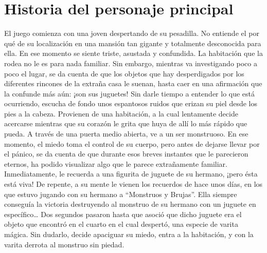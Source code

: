 \section{Historia del personaje principal}

El juego comienza con una joven despertando de su pesadilla. No entiende el por qué de su localización en una mansión tan gigante y totalmente desconocida para ella. En ese momento se siente triste, asustada y confundida. La habitación que la rodea no le es para nada familiar. Sin embargo, mientras va investigando poco a poco el lugar, se da cuenta de que los objetos que hay desperdigados por los diferentes rincones de la extraña casa le suenan, hasta caer en una afirmación que la confunde más aún: ¡son sus juguetes! Sin darle tiempo a entender lo que está ocurriendo, escucha de fondo unos espantosos ruidos que erizan su piel desde los pies a la cabeza. Provienen de una habitación, a la cual lentamente decide acercarse mientras que su corazón le grita que huya de allí lo más rápido que pueda. A través de una puerta medio abierta, ve a un ser monstruoso. En ese momento, el miedo toma el control de su cuerpo, pero antes de dejarse llevar por el pánico, se da cuenta de que durante esos breves instantes que le parecieron eternos, ha podido visualizar algo que le parece extrañamente familiar. Inmediatamente, le recuerda a una figurita de juguete de su hermano, ¡pero ésta está viva!\newline
\newline
De repente, a su mente le vienen los recuerdos de hace unos días, en los que estuvo jugando con su hermano a “Monstruos y Brujas”. Ella siempre conseguía la victoria destruyendo al monstruo de su hermano con un juguete en específico… Dos segundos pasaron hasta que asoció que dicho juguete era el objeto que encontró en el cuarto en el cual despertó, una especie de varita mágica. Sin dudarlo, decide apaciguar su miedo, entra a la habitación, y con la varita derrota al monstruo sin piedad.
\newpage
